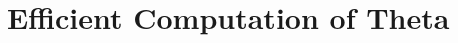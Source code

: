 \documentclass[12]{article}
\begin{document}
\section{Efficient Computation of Theta}\label{sec:computation}





\end{document}
